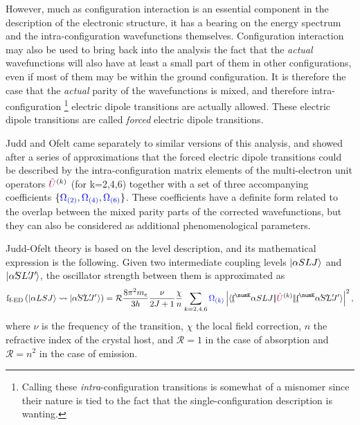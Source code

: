 \documentclass[11pt, twoside,openright]{article}
\begin{document}
However, much as configuration interaction is an essential component in the description of the electronic structure, it has a bearing on the energy spectrum and the intra-configuration wavefunctions themselves. Configuration interaction may also be used to bring back into the analysis the fact that the \textit{actual} wavefunctions will also have at least a small part of them in other configurations, even if most of them may be within the ground configuration. It is therefore the case that the \textit{actual} parity of the wavefunctions is mixed, and therefore intra-configuration  \footnote{Calling these \textit{intra}-configuration transitions is somewhat of a misnomer since their nature is tied to the fact that the single-configuration description is wanting.} electric dipole transitions are actually allowed. These electric dipole transitions are called \textit{forced} electric dipole transitions.


Judd \cite{judd_optical_1962} and Ofelt \cite{ofelt_intensities_1962} came separately to similar versions of this analysis, and showed after a series of approximations that the forced electric dipole transitions could be described by the intra-configuration matrix elements of the multi-electron unit operators $\textcolor{purple}{\hat{U}}^{(k)}$ (for k=2,4,6) together with a set of three accompanying coefficients $\{\textcolor{blue}{\Omega_{(2)}},\textcolor{blue}{\Omega_{(4)}},\textcolor{blue}{\Omega_{(6)}}\}$. These coefficients have a definite form related to the overlap between the mixed parity parts of the corrected wavefunctions, but they can also be considered as additional phenomenological parameters.

Judd-Ofelt theory is based on the level description, and its mathematical expression is the following. Given two intermediate coupling levels $|\alpha SLJ\rangle$ and $\ket{\alpha\mathrlap{'} SL\mathrlap{'}J\mathrlap{'}\,}$, the oscillator strength between them is approximated as \cite{judd_optical_1962} 
\begin{equation}
\oStrength{f-ED}{\alpha{LSJ}}{\alpha\mathrlap{'} S\mathrlap{'} L\mathrlap{'} J\mathrlap{'}\,\,} = 
	\mathcal{R} \frac{8 \pi^2 m_e}{3 h}
	\frac{\nu}{\tpo{J}}
	\frac{\chi}{n} 
	\sum_{k=2,4,6}
		\JOk{k} 
		\left|
			\redbraopket{\forb^\numE \alpha SLJ}
				{\op{U}^{(k)}}
				{\forb^\numE \alpha\mathrlap{'} S\mathrlap{'} L\mathrlap{'} J'} 
		\right|^2,
\label{eqn:forced-dipole-judd-ofelt}
\end{equation}
where $\nu$ is the frequency of the transition, $\chi$ the local field correction, $n$ the refractive index of the crystal host, and $\mathcal{R} = 1$ in the case of absorption and $\mathcal{R} = n^2$ in the case of emission. 
\end{document}
